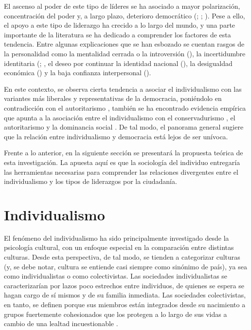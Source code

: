 \documentclass[12pt,twoside]{templates/facsothesis}
\begin{document}
El ascenso al poder de este tipo de líderes se ha asociado a mayor polarización, concentración del poder y, a largo plazo, deterioro democrático (\citet{lindstaedt2021}; \citet{brunkert2023}; \citet{kendall-taylor2017}). Pese a ello, el apoyo a este tipo de liderazgo ha crecido a lo largo del mundo, y una parte importante de la literatura se ha dedicado a comprender los factores de esta tendencia. Entre algunas explicaciones que se han esbozado se cuentan rasgos de la personalidad como la mentalidad cerrada o la introversión (\citet{armendarizmiranda2021}), la incertidumbre identitaria (\citet{hogg2021}; \citet{hogg2013}, el deseo por continuar la identidad nacional (\citet{selvanathan2022}), la desigualdad económica (\citet{sprong2019}) y la baja confianza interpersonal (\citet{xuereb2021}).

En este contexto, se observa cierta tendencia a asociar el individualismo con las variantes más liberales y representativas de la democracia, poniéndolo en contradicción con el autoritarismo \citep{gelfand1996}, también se ha encontrado evidencia empírica que apunta a la asociación entre el individualismo con el conservadurismo \citep{zhang2009}, el autoritarismo \citep{kemmelmeier2003} y la dominancia social \citep{strunk1999}. De tal modo, el panorama general sugiere que la relación entre individualismo y democracia está lejos de ser unívoca.

Frente a lo anterior, en la siguiente sección se presentará la propuesta teórica de esta investigación. La apuesta aquí es que la sociología del individuo entregaría las herramientas necesarias para comprender las relaciones divergentes entre el individualismo y los tipos de liderazgos por la ciudadanía.

\hypertarget{individualismo}{%
\section{Individualismo}\label{individualismo}}

El fenómeno del individualismo ha sido principalmente investigado desde la psicología cultural, con un enfoque especial en la comparación entre distintas culturas. Desde esta perspectiva, de tal modo, se tienden a categorizar culturas (y, se debe notar, cultura se entiende casi siempre como sinónimo de país), ya sea como individualistas o como colectivistas. Las sociedades individualistas se caracterizarían por lazos poco estrechos entre individuos, de quienes se espera se hagan cargo de sí mismos y de su familia inmediata. Las sociedades colectivistas, en tanto, se definen porque sus miembros están integrados desde su nacimiento a grupos fuertemente cohesionados que los protegen a lo largo de sus vidas a cambio de una lealtad incuestionable \citep{yoon2010}.
\end{document}
